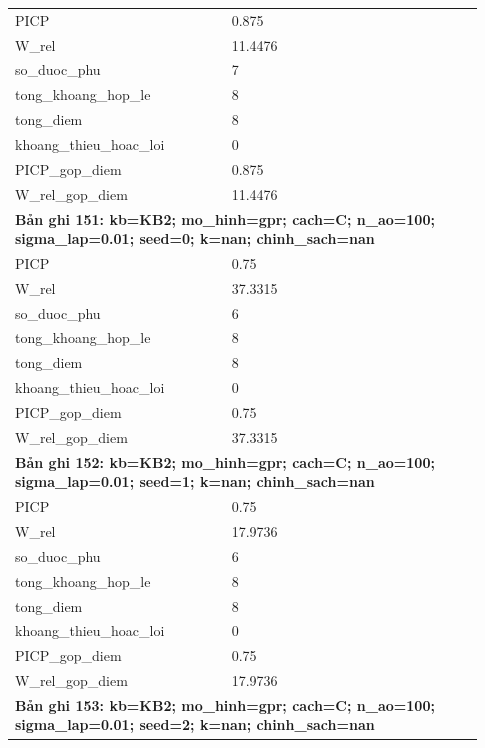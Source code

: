 \begin{longtable}{p{0.43\linewidth}p{0.50\linewidth}}
PICP & 0.875 \\
W\_\allowbreak rel & 11.4476 \\
so\_\allowbreak duoc\_\allowbreak phu & 7 \\
tong\_\allowbreak khoang\_\allowbreak hop\_\allowbreak le & 8 \\
tong\_\allowbreak diem & 8 \\
khoang\_\allowbreak thieu\_\allowbreak hoac\_\allowbreak loi & 0 \\
PICP\_\allowbreak gop\_\allowbreak diem & 0.875 \\
W\_\allowbreak rel\_\allowbreak gop\_\allowbreak diem & 11.4476 \\
\midrule
\multicolumn{2}{p{0.95\linewidth}}{\textbf{Bản ghi 151: kb=KB2; mo\_hinh=gpr; cach=C; n\_ao=100; sigma\_lap=0.01; seed=0; k=nan; chinh\_sach=nan}} \\
PICP & 0.75 \\
W\_\allowbreak rel & 37.3315 \\
so\_\allowbreak duoc\_\allowbreak phu & 6 \\
tong\_\allowbreak khoang\_\allowbreak hop\_\allowbreak le & 8 \\
tong\_\allowbreak diem & 8 \\
khoang\_\allowbreak thieu\_\allowbreak hoac\_\allowbreak loi & 0 \\
PICP\_\allowbreak gop\_\allowbreak diem & 0.75 \\
W\_\allowbreak rel\_\allowbreak gop\_\allowbreak diem & 37.3315 \\
\midrule
\multicolumn{2}{p{0.95\linewidth}}{\textbf{Bản ghi 152: kb=KB2; mo\_hinh=gpr; cach=C; n\_ao=100; sigma\_lap=0.01; seed=1; k=nan; chinh\_sach=nan}} \\
PICP & 0.75 \\
W\_\allowbreak rel & 17.9736 \\
so\_\allowbreak duoc\_\allowbreak phu & 6 \\
tong\_\allowbreak khoang\_\allowbreak hop\_\allowbreak le & 8 \\
tong\_\allowbreak diem & 8 \\
khoang\_\allowbreak thieu\_\allowbreak hoac\_\allowbreak loi & 0 \\
PICP\_\allowbreak gop\_\allowbreak diem & 0.75 \\
W\_\allowbreak rel\_\allowbreak gop\_\allowbreak diem & 17.9736 \\
\midrule
\multicolumn{2}{p{0.95\linewidth}}{\textbf{Bản ghi 153: kb=KB2; mo\_hinh=gpr; cach=C; n\_ao=100; sigma\_lap=0.01; seed=2; k=nan; chinh\_sach=nan}} \\

\end{longtable}
